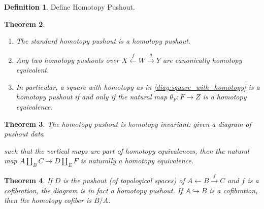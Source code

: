 \documentclass{scrartcl}
\theoremstyle{plain}
\newtheorem{theorem}{Theorem}[section]
\theoremstyle{definition}
\newtheorem{definition}[theorem]{Definition}
\newtheorem{remark}[theorem]{Remark}
\newcommand{\from}{\leftarrow}
\newcommand{\injto}{\hookrightarrow}
\renewcommand{\coprod}{\mathbin{\amalg}}
\begin{document}

\begin{definition}
    Define Homotopy Pushout.
\end{definition}

\begin{theorem}
    \begin{enumerate}
    \item The standard homotopy pushout is a homotopy pushout.
    \item Any two homotopy pushouts over $X\xleftarrow{f}W\xrightarrow{g}Y$ are canonically homotopy equivalent.
    \item In particular, a square with homotopy as in \ref{diag:square_with_homotopy} is a homotopy pushout if and only if the natural map $\theta_F\colon F\to Z$ is a homotopy equivalence. 
    \end{enumerate}
\end{theorem}

\begin{theorem}
    The homotopy pushout is homotopy invariant: given a diagram of pushout data 


    such that the vertical maps are part of homotopy equivalences, then the natural map $A\coprod_B C \to D\coprod_E F$ is naturally a homotopy equivalence.
\end{theorem}
\begin{theorem}
    If $D$ is the pushout (of topological spaces) of $A\from B\xrightarrow{f}C$ and $f$ is a cofibration, the diagram is in fact a homotopy pushout. If $A\injto B$ is a cofibration, then the homotopy cofiber is $B/A$.
\end{theorem}
\end{document}
